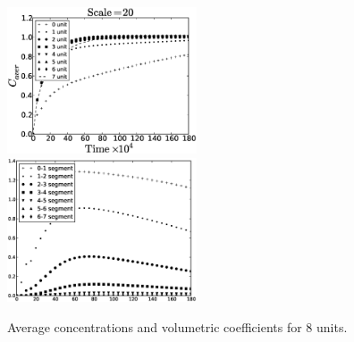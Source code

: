 \documentclass{article}
\begin{document}
\begin{figure}[htb!]
\includegraphics[width=0.5\textwidth]{Figures/aver_units8scale20.eps}\hfill
\includegraphics[width=0.5\textwidth]{Figures/coeff_units8scale20.eps}\\
\caption{Average concentrations and volumetric coefficients for $8$ units.
\label{fig:unit:8}}
\end{figure}
\end{document}
